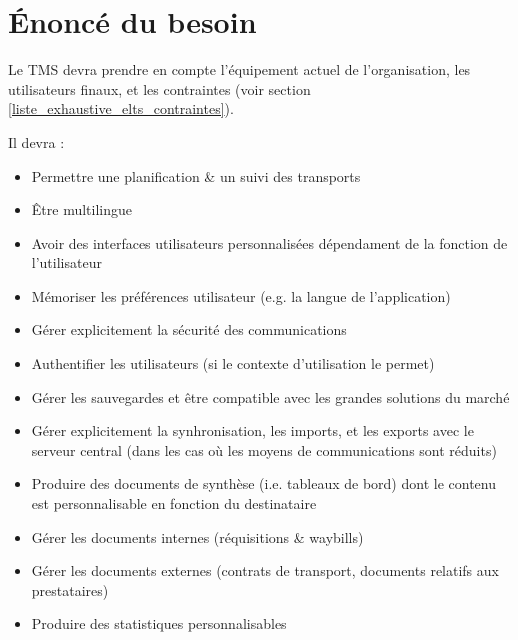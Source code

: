 
\section{Énoncé du besoin}

Le TMS devra prendre en compte l'équipement actuel de l'organisation, les utilisateurs finaux, et les contraintes (voir section \ref{liste_exhaustive_elts_contraintes}).

Il devra :
\begin{itemize}
\item Permettre une planification \& un suivi des transports
\item Être multilingue
\item Avoir des interfaces utilisateurs personnalisées dépendament de la fonction de l'utilisateur
\item Mémoriser les préférences utilisateur (e.g. la langue de l'application)
\item Gérer explicitement la sécurité des communications
\item Authentifier les utilisateurs (si le contexte d'utilisation le permet)
\item Gérer les sauvegardes et être compatible avec les grandes solutions du marché
\item Gérer explicitement la synhronisation, les imports, et les exports avec le serveur central (dans les cas où les moyens de communications sont réduits)
\item Produire des documents de synthèse (i.e. tableaux de bord) dont le contenu est personnalisable en fonction du destinataire
\item Gérer les documents internes (réquisitions \& waybills)
\item Gérer les documents externes (contrats de transport, documents relatifs aux prestataires)
\item Produire des statistiques personnalisables
\end{itemize}

